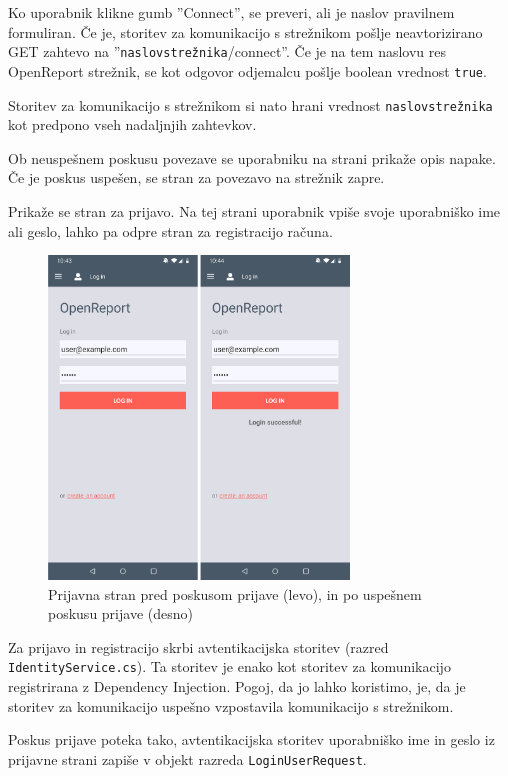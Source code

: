 \documentclass[a4paper, 12pt]{book}
\begin{document}
Ko uporabnik klikne gumb ''Connect'', se preveri, ali je naslov pravilnem formuliran.
Če je, storitev za komunikacijo s strežnikom pošlje neavtorizirano GET zahtevo na ''\texttt{naslovstrežnika}/connect''. 
Če je na tem naslovu res OpenReport strežnik, se kot odgovor odjemalcu pošlje boolean vrednost \texttt{true}.

Storitev za komunikacijo s strežnikom si nato hrani vrednost \texttt{naslovstrežnika} kot predpono vseh nadaljnjih zahtevkov.

Ob neuspešnem poskusu povezave se uporabniku na strani prikaže opis napake.
Če je poskus uspešen, se stran za povezavo na strežnik zapre.

Prikaže se stran za prijavo.
Na tej strani uporabnik vpiše svoje uporabniško ime ali geslo, lahko pa odpre stran za registracijo računa.


\begin{figure}[H]
\begin{center}
\includegraphics[width=8cm]{app_login}
\end{center}
	\caption{Prijavna stran pred poskusom prijave (levo), in po uspešnem poskusu prijave (desno)}
\label{app_login}
\end{figure}


Za prijavo in registracijo skrbi avtentikacijska storitev (razred \\\texttt{IdentityService.cs}).
Ta storitev je enako kot storitev za komunikacijo registrirana z Dependency Injection.
Pogoj, da jo lahko koristimo, je, da je storitev za komunikacijo uspešno vzpostavila komunikacijo s strežnikom.

Poskus prijave poteka tako, avtentikacijska storitev uporabniško ime in geslo iz prijavne strani zapiše v objekt razreda \texttt{LoginUserRequest}.
\end{document}
